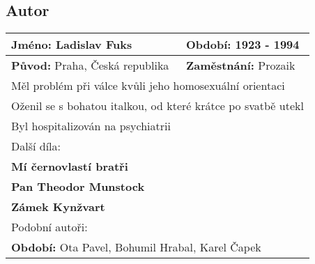\subsection*{Autor}
\begin{tabularx}{\linewidth}{l|l}
  \textbf{Jméno:} Ladislav Fuks          & \textbf{Období:} 1923 - 1994            \\
  \hline
  \textbf{Původ:} Praha, Česká republika & \textbf{Zaměstnání:} Prozaik            \\
  \hline
  \multicolumn{2}{l}{Měl problém při válce kvůli jeho homosexuální orientaci}      \\
  \multicolumn{2}{l}{Oženil se s bohatou italkou, od které krátce po svatbě utekl} \\
  \multicolumn{2}{l}{Byl hospitalizován na psychiatrii}                            \\
  \hline
  \multicolumn{2}{l}{Další díla:}                                                  \\
  \multicolumn{2}{l}{\textbf{Mí černovlastí bratři}}                               \\
  \multicolumn{2}{l}{\textbf{Pan Theodor Munstock}}                                \\
  \multicolumn{2}{l}{\textbf{Zámek Kynžvart}}                                      \\
  \hline
  \multicolumn{2}{l}{Podobní autoři:}                                              \\
  \multicolumn{2}{l}{\textbf{Období:} Ota Pavel, Bohumil Hrabal, Karel Čapek}      \\
\end{tabularx}

